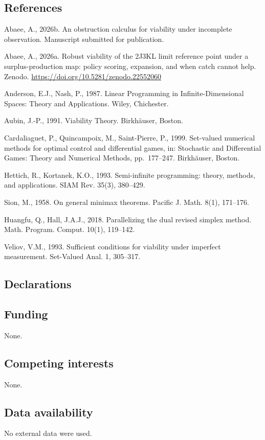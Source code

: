 \documentclass[10pt,twocolumn]{article}
\theoremstyle{plain}
\theoremstyle{definition}
\theoremstyle{remark}
\begin{document}
\subsection*{References}

Abaee, A., 2026b. An obstruction calculus for viability under incomplete
observation. Manuscript submitted for publication.

Abaee, A., 2026a. Robust viability of the 2J3KL limit reference point
under a surplus-production map: policy scoring, expansion, and when catch
cannot help. Zenodo. \url{https://doi.org/10.5281/zenodo.22552060}

Anderson, E.J., Nash, P., 1987. Linear Programming in Infinite-Dimensional
Spaces: Theory and Applications. Wiley, Chichester.

Aubin, J.-P., 1991. Viability Theory. Birkh\"auser, Boston.

Cardaliaguet, P., Quincampoix, M., Saint-Pierre, P., 1999. Set-valued
numerical methods for optimal control and differential games, in:
Stochastic and Differential Games: Theory and Numerical Methods,
pp.~177--247. Birkh\"auser, Boston.

Hettich, R., Kortanek, K.O., 1993. Semi-infinite programming: theory,
methods, and applications. SIAM Rev. 35(3), 380--429.

Sion, M., 1958. On general minimax theorems. Pacific J. Math. 8(1),
171--176.

Huangfu, Q., Hall, J.A.J., 2018. Parallelizing the dual revised simplex
method. Math. Program. Comput. 10(1), 119--142.

Veliov, V.M., 1993. Sufficient conditions for viability under imperfect
measurement. Set-Valued Anal. 1, 305--317.

\subsection*{Declarations}

\subsection*{Funding}
None.

\subsection*{Competing interests}
None.

\subsection*{Data availability}
No external data were used.
\end{document}
